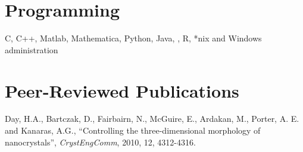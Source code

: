 \documentclass[margin,line]{resume}
\begin{document}
\begin{resume}
    \section{\mysidestyle Programming} 

    C, C++, Matlab, Mathematica, Python, Java, \LaTeXe, R, *nix and Windows administration

    \section{\mysidestyle Peer-Reviewed Publications}

    
	Day, H.A.,  Bartczak, D.,  Fairbairn, N.,  McGuire, E., Ardakan, M., Porter, A. E. and Kanaras, A.G.,
    ``Controlling the three-dimensional morphology of nanocrystals'',
    \textsl{CrystEngComm}, 2010, 12, 4312-4316.

\vspace{-2mm}



\end{resume}
\end{document}
